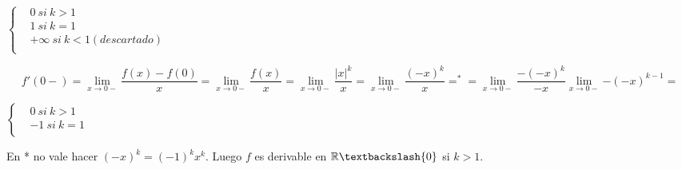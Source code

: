 \documentclass{report}
\begin{document}
\begin{itemize}
				$\begin{cases}
					&0 \ si\ k>1 \\
					&1 \ si\ k=1 \\
					&+\infty \ si \ k<1 (descartado)\\
				\end{cases}$
			
				$$f'(0-) = \lim_{x \to 0-}{\frac{f(x)-f(0)}{x}} = \lim_{x \to 0-}{\frac{f(x)}{x}} = \lim_{x \to 0-}{\frac{|x|^{k}}{x}} = \lim_{x \to 0-}{\frac{(-x)^{k}}{x}} =^{*} = \lim_{x \to 0-}{\frac{-(-x)^{k}}{-x} \lim_{x \to 0-}{-(-x)^{k-1}}} = $$
				
				$\begin{cases}
					&0 \ si\ k>1 \\
					&-1 \ si\ k=1 \\
				\end{cases}$
			
			En * no vale hacer $(-x)^{k}=(-1)^kx^k$.  Luego $f$ es derivable en $\mathbb{R}\textbackslash \{0\}$ si $k>1$.
			\end{itemize}
		
\end{document}
